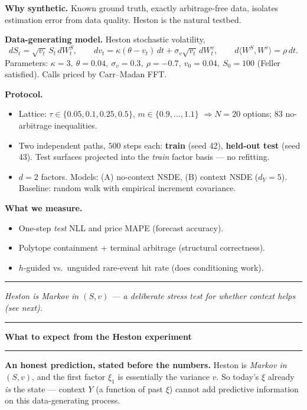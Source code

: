 \documentclass[12pt]{article}
\newcommand{\slide}[1]{%
  \par\noindent\rule{\linewidth}{1.2pt}\par\vspace{2pt}%
  {\LARGE\bfseries #1}\par\vspace{2pt}%
  \noindent\rule{\linewidth}{0.5pt}\par\vspace{8pt}}
\newcommand{\footer}[1]{\vfill\noindent\rule{\linewidth}{0.3pt}\par
  {\small\itshape #1}}
\begin{document}
\textbf{Why synthetic.} Known ground truth, exactly arbitrage-free data,
isolates estimation error from data quality. Heston is the natural testbed.

\vspace{6pt}
\textbf{Data-generating model.} Heston stochastic volatility,
\[
dS_t = \sqrt{v_t}\,S_t\,dW_t^S,\qquad
dv_t = \kappa(\theta - v_t)\,dt + \sigma_v\sqrt{v_t}\,dW_t^v,\qquad
d\langle W^S,W^v\rangle=\rho\,dt.
\]
Parameters: $\kappa=3,\ \theta=0.04,\ \sigma_v=0.3,\ \rho=-0.7,\ v_0=0.04,\
S_0=100$ (Feller satisfied). Calls priced by Carr--Madan FFT.

\vspace{6pt}
\textbf{Protocol.}
\begin{itemize}
\item Lattice: $\tau\in\{0.05,0.1,0.25,0.5\}$, $m\in\{0.9,\dots,1.1\}$
  $\Rightarrow N=20$ options; $83$ no-arbitrage inequalities.
\item Two independent paths, $500$ steps each: \textbf{train} (seed 42),
  \textbf{held-out test} (seed 43). Test surfaces projected into the
  \emph{train} factor basis --- no refitting.
\item $d=2$ factors. Models: (A) no-context NSDE, (B) context NSDE
  ($d_Y=5$). Baseline: random walk with empirical increment covariance.
\end{itemize}

\vspace{6pt}
\textbf{What we measure.}
\begin{itemize}
\item One-step \emph{test} NLL and price MAPE (forecast accuracy).
\item Polytope containment + terminal arbitrage (structural correctness).
\item $h$-guided vs.\ unguided rare-event hit rate (does conditioning work).
\end{itemize}

\footer{Heston is Markov in $(S,v)$ --- a deliberate stress test for whether context helps (see next).}
\clearpage

\slide{What to expect from the Heston experiment}

\textbf{An honest prediction, stated before the numbers.}
Heston is \emph{Markov in $(S,v)$}, and the first factor $\xi_1$ is
essentially the variance $v$. So today's $\xi$ already \emph{is} the state
--- context $Y$ (a function of past $\xi$) cannot add predictive
information on this data-generating process.
\end{document}
